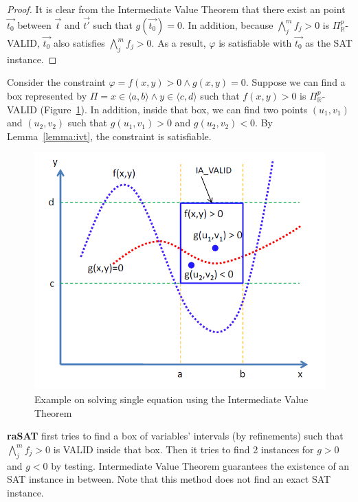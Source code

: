 \documentclass[runningheads,a4paper,oribibl]{llncs}
\begin{document}
\begin{proof}
It is clear from the Intermediate Value Theorem that there exist an point $\vec{t_0}$ between $\vec{t}$ and $\vec{t'}$ such that $g(\vec{t_0}) = 0$. In addition, because $\bigwedge \limits_{j}^m f_j > 0$ is $\Pi^p_\mathbb{R}$-VALID, $\vec{t_0}$ also satisfies $\bigwedge \limits_{j}^m f_j > 0$. As a result, $\varphi$ is satisfiable with $\vec{t_0}$ as the SAT instance.
\end{proof}

\begin{example}
Consider the constraint $\varphi = f(x, y) > 0 \wedge g(x, y) = 0$. Suppose we can find a box represented by $\Pi = x \in \langle a, b \rangle \wedge y \in \langle c, d \rangle$ such that $f(x, y) > 0$ is $\Pi^p_\mathbb{R}$-VALID (Figure~\ref{fig:single-equation}). In addition, inside that box, we can find two points $(u_1, v_1)$ and $(u_2, v_2)$ such that $g(u_1, v_1) > 0$ and $g(u_2, v_2) < 0$. By Lemma~\ref{lemma:ivt}, the constraint is satisfiable.
\end{example}
\begin{figure}[ht]
\centering
\includegraphics[scale=0.5]{singleEquation.png} 
\caption{Example on solving single equation using the Intermediate Value Theorem} 
\label{fig:single-equation} 
\end{figure} 
{\bf raSAT} first tries to find a box of variables' intervals (by refinements) such that $\bigwedge \limits_{j}^m f_j > 0$ is VALID inside that box. Then it tries to find 2 instances for $g > 0$ and $g < 0$ by testing. 
Intermediate Value Theorem guarantees the existence of an SAT instance in between. 
Note that this method does not find an exact SAT instance. 
\end{document}
